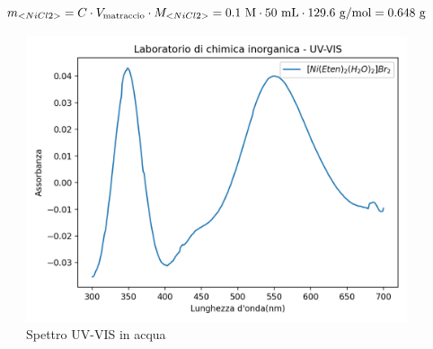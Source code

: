 \[ m_{<NiCl2>} = C \cdot V_{\text{matraccio}} \cdot M_{<NiCl2>}  = 0.1 \mathrm{\ M} \cdot 50 \mathrm{\ mL} \cdot 129.6 \mathrm{\ g/mol} = 0.648 \mathrm{\ g} \]
\begin{figure}[ht!]
    \centering
   \includegraphics{Relazione/foto/Nibr2.png}
    \caption{Spettro UV-VIS  in acqua}
    \label{fig:NiEtenuv}
\end{figure}
